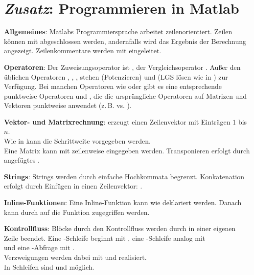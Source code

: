 \chapter{%
    \emph{Zusatz}: Programmieren in Matlab%
}

\textbf{Allgemeines}:
Matlabs Programmiersprache arbeitet zeilenorientiert.
Zeilen können mit \code{;} abgeschlossen werden, andernfalls wird das
Ergebnis der Berechnung angezeigt.
Zeilenkommentare werden mit \code{\%} eingeleitet.

\textbf{Operatoren}:
Der Zuweisungsoperator ist \code{=}, der Vergleichsoperator \code{==}.
Außer den üblichen Operatoren \code{+}, \code{-}, \code{*}, \code{/} stehen
\code{^} (Potenzieren) und \code{\\} (LGS lösen wie in )
zur Verfügung.
Bei manchen Operatoren wie \code{*} oder \code{^} gibt es eine entsprechende
punktweise Operatoren  und , die die ursprüngliche Operatoren
auf Matrizen und Vektoren punktweise anwendet (z.\,B.  vs.
).

\textbf{Vektor- und Matrixrechnung}:
 erzeugt einen Zeilenvektor mit Einträgen $1$ bis $n$. \\
Wie in  kann die Schrittweite vorgegeben werden. \\
Eine Matrix kann mit \code{[a1, a2, a3; a4, a5, a6]} zeilenweise eingegeben
werden.
Transponieren erfolgt durch angefügtes .

\textbf{Strings}:
Strings werden durch einfache Hochkommata  begrenzt.
Konkatenation erfolgt durch Einfügen in einen Zeilenvektor:
.

\textbf{Inline-Funktionen}:
Eine Inline-Funktion kann wie  deklariert werden.
Danach kann durch  auf die Funktion zugegriffen werden.

\textbf{Kontrollfluss}:
Blöcke durch den Kontrollfluss werden durch  in einer eigenen
Zeile beendet.
Eine -Schleife beginnt mit ,
eine -Schleife analog mit \\
 und
eine -Abfrage mit . \\
Verzweigungen werden dabei mit  und 
realisiert. \\
In Schleifen sind  und  möglich.

